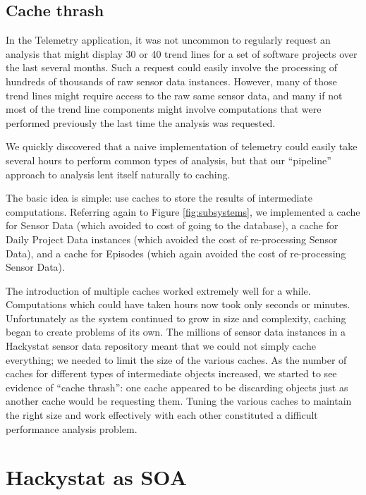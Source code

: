 \documentclass[conference,compsoc]{IEEEtran}
\begin{document}
\subsection{Cache thrash}
\label{sec:caching}

In the Telemetry application, it was not uncommon to regularly request an
analysis that might display 30 or 40 trend lines for a set of software
projects over the last several months. Such a request could easily involve
the processing of hundreds of thousands of raw sensor data
instances. However, many of those trend lines might require access to the
raw same sensor data, and many if not most of the trend line components
might involve computations that were performed previously the last time the
analysis was requested.

We quickly discovered that a naive implementation of telemetry could
easily take several hours to perform common types of analysis, but that our 
``pipeline'' approach to analysis lent itself naturally to caching.

The basic idea is simple: use caches to store the results of intermediate
computations.  Referring again to Figure \ref{fig:subsystems}, we
implemented a cache for Sensor Data (which avoided to cost of going to the
database), a cache for Daily Project Data instances (which avoided the cost
of re-processing Sensor Data), and a cache for Episodes (which again
avoided the cost of re-processing Sensor Data).

The introduction of multiple caches worked extremely well for a while.
Computations which could have taken hours now took only seconds or minutes.
Unfortunately as the system continued to grow in size and complexity,
caching began to create problems of its own.  The millions of sensor data
instances in a Hackystat sensor data repository meant that we could not
simply cache everything; we needed to limit the size of the various caches.
As the number of caches for different types of intermediate objects
increased, we started to see evidence of ``cache thrash'': one cache
appeared to be discarding objects just as another cache would be requesting
them. Tuning the various caches to maintain the right size and work
effectively with each other constituted a difficult performance analysis problem.

\section{Hackystat as SOA}
\label{sec:soa}
\end{document}

